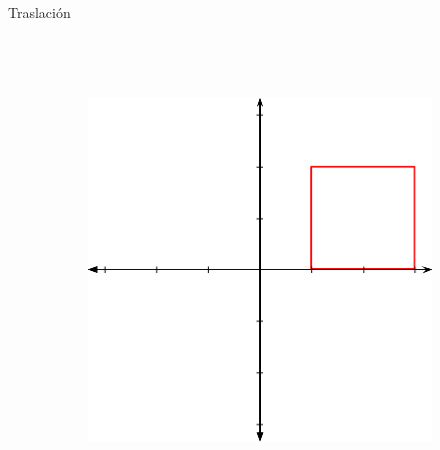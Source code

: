 \begin{frame}{Traslación}
\begin{columns}
\begin{figure}[htp]
\begin{subfigure}[b]{0.4\textwidth}
 \end{subfigure}
\\
\vspace{0.15cm}
 \begin{subfigure}[b]{0.4\textwidth}
   \includegraphics[width=\textwidth]{img/Translated}
 \end{subfigure}
\end{figure}
\end{columns}
\end{frame}

